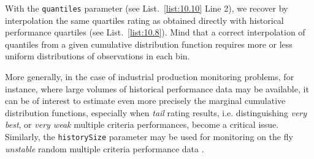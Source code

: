 With the \texttt{quantiles} parameter (see List.~\vref{list:10.10} Line 2), we recover by interpolation the same quartiles rating as obtained directly with historical performance quartiles (see List.~\vref{list:10.8}). Mind that a correct interpolation of quantiles from a given cumulative distribution function requires more or less uniform distributions of observations in each bin. 

More generally, in the case of industrial production monitoring problems, for instance, where large volumes of historical performance data may be available, it can be of interest to estimate even more precisely the marginal cumulative distribution functions, especially when \emph{tail} rating results, i.e. distinguishing \emph{very best}, or \emph{very weak} multiple criteria performances, become a critical issue. Similarly, the \texttt{historySize} parameter may be used for monitoring on the fly \emph{unstable} random multiple criteria performance data \citep{CHAM-2006}.  	

% 


